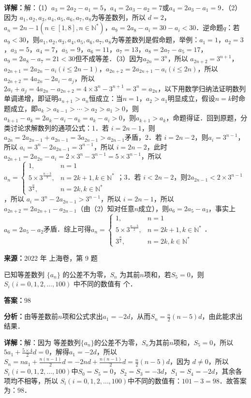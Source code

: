 \begin{question}[points=18]
\begin{solution}
\textbf{详解：}解：（1）$a_3=2a_2-a_1=5$，$a_4=2a_3-a_2=7$或$a_4=2a_3-a_1=9$．（2）因为 $a_1,a_2,a_3,a_4,a_5,a_6,a_7,a_8$为等差数列，所以 $d=2$，$a_n=2n-1(n\in[1,8],n\in\mathbb{N}^*)$，$a_9=2a_8-a_i=30-a_i<30$．逆命题$q$：若$a_9<30$，则$a_1,a_2,a_3,a_4,a_5,a_6,a_7,a_8$为等差数列是假命题，举例：$a_1=1$，$a_2=3$，$a_3=5$，$a_4=7$，$a_5=9$，$a_6=11$，$a_7=13$，$a_8=2a_7-a_5=17$，$a_9=2a_8-a_7=21<30$但不成等差．（3）因为$a_{2n}=3^n$，所以 $a_{2n+2}=3^{n+1}$，$a_{2n+1}=2a_{2n}-a_i(i\leq 2n-1)$，$a_{2n+2}=2a_{2n+1}-a_i(i\leq 2n)$，所以 $a_{2n+2}=4a_{2n}-2a_i-a_j$，所以 $2a_i+a_j=4a_{2n}-a_{2n+2}=4\times3^n-3^{n+1}=3^n=a_{2n}$，以下用数学归纳法证明数列单调递增，即证明$a_{n+1}>a_n$恒成立：当$n=1$，$a_2>a_1$明显成立，假设$n=k$时命题成立，即$a_k>a_{k-1}>\cdots>a_2>a_1>0$，则$a_{k+1}-a_k=2a_k-a_i-a_k=a_k-a_i>0$，则$a_{k+1}>a_k$，命题得证．回到原题，分类讨论求解数列的通项公式：1．若 $i=2n-1$，则$a_{2n}=2a_{2n-1}+a_{2n-1}=3a_{2n-1}>a_{2n-1}$矛盾，2．若 $i=2n-2$，则$a_i=3^{n-1}$，所以 $a_i=3^n-2a_{2n-1}=3^{n-1}$，所以 $i=2n-2$，此时$a_{2n+1}=2a_{2n}-a_i=2\times3^n-3^{n-1}=5\times3^{n-1}$，所以 $a_n=\begin{cases}1, & n=1\\5\times3^{\frac{n-3}{2}}, & n=2k+1,k\in\mathbb{N}^*\\3^{\frac{n}{2}}, & n=2k,k\in\mathbb{N}^*\end{cases}$；3．若 $i<2n-2$，则$2a_{2n-1}<2\times3^{n-1}$，所以 $a_i=3^n-2a_{2n-1}>3^{n-1}$，所以 $i=2n-1$，所以 $a_{2n+2}=2a_{2n+1}-a_{2n-1}$（由（2）知对任意$n$成立），则$a_6=2a_5-a_3$，事实上$a_6=2a_5-a_2$矛盾．综上可得$a_n=\begin{cases}1, & n=1\\5\times3^{\frac{n-3}{2}}, & n=2k+1,k\in\mathbb{N}^*\\3^{\frac{n}{2}}, & n=2k,k\in\mathbb{N}^*\end{cases}$．
\end{solution}
\end{question}

\begin{question}[points=5]
\textbf{来源：}2022 年 上海卷，第 9 题\par
已知等差数列 $\{a_n\}$ 的公差不为零，$S_n$ 为其前$n$项和，若$S_5 = 0$，则$S_i (i = 0,1,2,\ldots,100)$ 中不同的数值有  个．
\fillin[{$98$}]
\begin{solution}
\textbf{答案：}$98$

\textbf{分析：}由等差数前$n$项和公式求出$a_1=-2d$，从而$S_n=\frac{n}{2}(n-5)d$，由此能求出结果．

\textbf{详解：}解：因为 等差数列$\{a_n\}$的公差不为零，$S_n$为其前$n$项和，$S_5=0$，所以 $5a_1+\frac{5\times4}{2}d=0$，解得$a_1=-2d$，所以 $S_n=na_1+\frac{n(n-1)}{2}d=-2nd+\frac{n(n-1)}{2}d=\frac{n}{2}(n-5)d$，因为 $d\neq0$，所以 $S_i(i=0,1,2,\ldots,100)$中$S_0=S_5=0$，$S_2=S_3=-3d$，$S_1=S_4=-2d$，其余各项均不相等，所以 $S_i(i=0,1,2,\ldots,100)$中不同的数值有：$101-3=98$．故答案为：$98$．
\end{solution}
\end{question}

